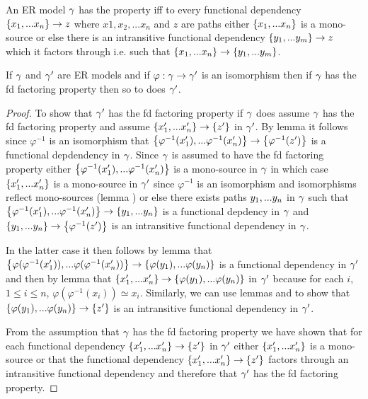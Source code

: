  
\begin{definition}
\noindent An ER model $\gamma$ has the \term{\fdfactoring} property iff to every functional dependency $\left\{x_1,...x_n\right\} \rightarrow z$ where $x1, x_2, ... x_n$ and $z$ are \oldt{\attributelike} paths either $\left\{x_1,...x_n\right\}$ is
a mono-source or else there is an intransitive functional dependency $\left\{y_1,...y_m\right\} \rightarrow z$ which it factors through i.e. such that $\left\{x_1,...x_n\right\} \rightarrow \left\{y_1,...y_m\right\}$. 
\end{definition}

\begin{lemma}
If $\gamma$ and $\gamma'$ are ER models and if $\varphi:\gamma \rightarrow \gamma'$ is an isomorphism
then if $\gamma$ has the fd factoring property then so to does $\gamma'$.
\end{lemma}
\begin{proof}
To show that $\gamma'$ has the fd factoring property if $\gamma$ does assume $\gamma$ has the fd factoring property and assume $\left\{x'_1,...x'_n\right\} \rightarrow \left\{z'\right\}$ in $\gamma'$. 
By lemma  it follows since $\varphi^{-1}$ is an isomorphism that $\left\{\varphi^{-1}(x'_1),...\varphi^{-1}(x'_n)\right\} \rightarrow \left\{\varphi^{-1}(z')\right\}$ is a functional depdendency
in $\gamma$. Since $\gamma$ is assumed to have the fd factoring property either $\left\{\varphi^{-1}(x'_1),...\varphi^{-1}(x'_n)\right\}$ is a mono-source in $\gamma$ in which case $\left\{x'_1,...x'_n\right\}$ is a mono-source in 
$\gamma'$ since $\varphi^{-1}$ is an isomorphism  and isomorphisms reflect mono-sources (lemma ) or else there exists paths $y_1,...y_n$ in $\gamma$ such that
$\left\{\varphi^{-1}(x'_1),...\varphi^{-1}(x'_n)\right\} \rightarrow \left\{y_1,...y_n\right\}$ is a functional depdency in $\gamma$ and 
 $\left\{y_1,...y_n\right\} \rightarrow \left\{\varphi^{-1}(z')\right\}$ is an intransitive functional dependency in $\gamma$.  

In the latter case it then follows by lemma
 that
 $\left\{\varphi(\varphi^{-1}(x'_1)),...\varphi(\varphi^{-1}(x'_n))\right\} \rightarrow \left\{\varphi(y_1),...\varphi(y_n)\right\}$
is a functional dependency in $\gamma'$
and then by lemma   that $\left\{x'_1,...x'_n\right\} \rightarrow \left\{\varphi(y_1),...\varphi(y_n)\right\}$ in $\gamma'$
because for each $i$, $1 \leq i \leq n$, $\varphi(\varphi^{-1}(x_i)) \simeq x_i$.
Similarly, we can use lemmas  and  to show that $\left\{\varphi(y_1),...\varphi(y_n)\right\} \rightarrow \left\{z'\right\}$ is an intransitive functional dependency in $\gamma'$. 

From the assumption that $\gamma$ has the fd factoring property we have shown that for each functional dependency $\left\{x'_1,...x'_n\right\} \rightarrow \left\{z'\right\}$ in $\gamma'$ either $\left\{x'_1,...x'_n\right\}$ is a mono-source  or
that the functional dependency  $\left\{x'_1,...x'_n\right\} \rightarrow \left\{z'\right\}$ factors through an intransitive functional dependency and  therefore that $\gamma'$ has the fd factoring property.
\end{proof}


